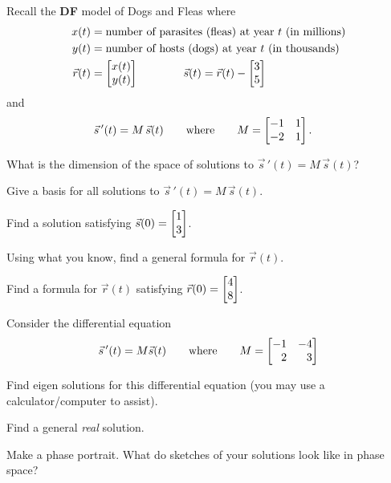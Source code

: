 \documentclass{workbook}
\begin{document}
\begin{slide}
	\question
 		Recall the \textbf{DF} model of Dogs and Fleas where 
	\begin{align*}
		x(t) &= \text{number of parasites (fleas) at year $t$ (in millions)}\\
		y(t) &= \text{number of hosts (dogs) at year $t$ (in thousands)}\\
		\vec r(t) &= \mat{x(t)\\y(t)} \qquad\qquad
		\vec s(t) = \vec r(t) - \mat{3\\5}
	\end{align*}
	and
	\begin{align*}
		\vec s\,'(t) &= M\,\vec s(t)\qquad\text{where}\qquad M=\mat{-1&1\\-2&1}.
	\end{align*}
	
	\begin{parts}
		\item What is the dimension of the space of solutions to $\vec s\,'(t) = M\,\vec s(t)$?
		\item Give a basis for all solutions to $\vec s\,'(t) = M\,\vec s(t)$.
		\item Find a solution satisfying $\vec s(0)=\mat{1\\3}$.
		\bigskip 
		\item Using what you know, find a general formula for $\vec r(t)$.
		\item Find a formula for $\vec r(t)$ satisfying $\vec r(0)=\mat{4\\8}$.
	\end{parts}
\end{slide}

\begin{slide}
	\question
		Consider the differential equation
		\[
		\vec s\,'(t) = M\vec s(t)\qquad\text{where}\qquad M=\mat{-1&-4\\2&3}
		\]
	
	\begin{parts}
		\item Find eigen solutions for this differential equation (you may use a calculator/computer to assist).
		\item Find a general \emph{real} solution.
		\item Make a phase portrait. What do sketches of your solutions look like in phase space?
	\end{parts}
\end{slide}
\end{document}
